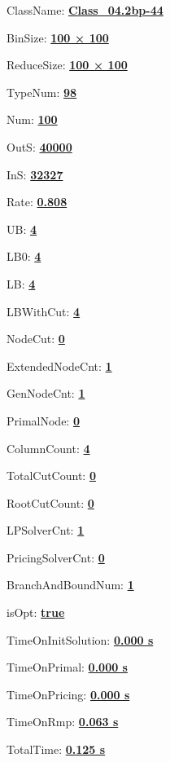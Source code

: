 \documentclass[11pt]{article}
\begin{document}
\pagestyle{empty}


ClassName: \underline{\textbf{Class_04.2bp-44}}
\par
BinSize: \underline{\textbf{100 × 100}}
\par
ReduceSize: \underline{\textbf{100 × 100}}
\par
TypeNum: \underline{\textbf{98}}
\par
Num: \underline{\textbf{100}}
\par
OutS: \underline{\textbf{40000}}
\par
InS: \underline{\textbf{32327}}
\par
Rate: \underline{\textbf{0.808}}
\par
UB: \underline{\textbf{4}}
\par
LB0: \underline{\textbf{4}}
\par
LB: \underline{\textbf{4}}
\par
LBWithCut: \underline{\textbf{4}}
\par
NodeCut: \underline{\textbf{0}}
\par
ExtendedNodeCnt: \underline{\textbf{1}}
\par
GenNodeCnt: \underline{\textbf{1}}
\par
PrimalNode: \underline{\textbf{0}}
\par
ColumnCount: \underline{\textbf{4}}
\par
TotalCutCount: \underline{\textbf{0}}
\par
RootCutCount: \underline{\textbf{0}}
\par
LPSolverCnt: \underline{\textbf{1}}
\par
PricingSolverCnt: \underline{\textbf{0}}
\par
BranchAndBoundNum: \underline{\textbf{1}}
\par
isOpt: \underline{\textbf{true}}
\par
TimeOnInitSolution: \underline{\textbf{0.000 s}}
\par
TimeOnPrimal: \underline{\textbf{0.000 s}}
\par
TimeOnPricing: \underline{\textbf{0.000 s}}
\par
TimeOnRmp: \underline{\textbf{0.063 s}}
\par
TotalTime: \underline{\textbf{0.125 s}}
\par
\newpage
\end{document}
